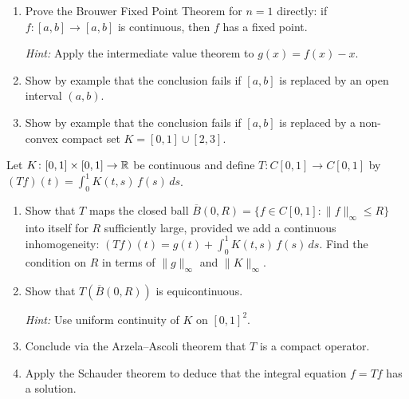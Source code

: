 \documentclass[11pt,a4paper]{article}
\begin{document}
\begin{exercise}\label{ex:brouwer-1d}
\begin{enumerate}[label=(\alph*)]
    \item Prove the Brouwer Fixed Point Theorem for $n = 1$ directly:
          if $f \colon [a, b] \to [a, b]$ is continuous, then $f$ has
          a fixed point.

          \emph{Hint:}  Apply the intermediate value theorem to
          $g(x) = f(x) - x$.
    \item Show by example that the conclusion fails if $[a,b]$ is
          replaced by an open interval $(a, b)$.
    \item Show by example that the conclusion fails if $[a,b]$ is
          replaced by a non-convex compact set
          $K = [0, 1] \cup [2, 3]$.
\end{enumerate}
\end{exercise}

\begin{exercise}\label{ex:schauder-integral}
Let $K \colon [0,1] \times [0,1] \to \mathbb{R}$ be continuous and define
$T \colon C[0,1] \to C[0,1]$ by
$(Tf)(t) = \int_0^1 K(t,s)\, f(s)\, ds$.
\begin{enumerate}[label=(\alph*)]
    \item Show that $T$ maps the closed ball
          $\overline{B}(0, R) = \{f \in C[0,1] : \|f\|_\infty
          \leq R\}$ into itself for $R$ sufficiently large, provided
          we add a continuous inhomogeneity:
          $(Tf)(t) = g(t) + \int_0^1 K(t,s)\, f(s)\, ds$.
          Find the condition on $R$ in terms of $\|g\|_\infty$ and
          $\|K\|_\infty$.
    \item Show that $T(\overline{B}(0, R))$ is equicontinuous.

          \emph{Hint:} Use uniform continuity of $K$ on
          $[0,1]^2$.
    \item Conclude via the Arzela--Ascoli theorem that $T$ is a
          compact operator.
    \item Apply the Schauder theorem to deduce that the integral
          equation $f = Tf$ has a solution.
\end{enumerate}
\end{exercise}
\end{document}
